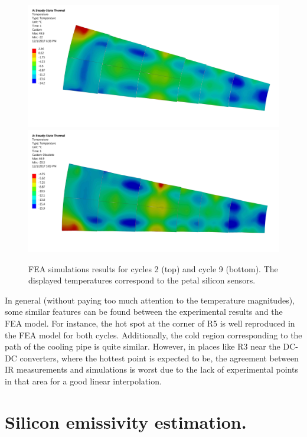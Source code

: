 		\begin{figure}[ht!]
			\centering
			\captionsetup{justification=centering,margin=0cm}
			\includegraphics[scale=0.045]{Figures/Chapter04/FEA_thermogram_markers_2_201711271001.jpg}
			\includegraphics[scale=0.045]{Figures/Chapter04/FEA_thermogram_markers_9_201711271006.jpg}
			\caption{FEA simulations results for cycles 2 (top) and cycle 9 (bottom). The displayed temperatures correspond to the petal silicon sensors.}\label{fig4.3}
		\end{figure}	
		
		In general (without paying too much attention to the temperature magnitudes), some similar features can be found between the experimental results and the FEA model. For instance, the hot spot at the corner of R5 is well reproduced in the FEA model for both cycles. Additionally, the cold region corresponding to the path of the cooling pipe is quite similar. However, in places like R3 near the DC-DC converters, where the hottest point is expected to be, the agreement between IR measurements and simulations is worst due to the lack of experimental points in that area for a good linear interpolation.
	
	\section{Silicon emissivity estimation.}\label{section4.3}	
	
